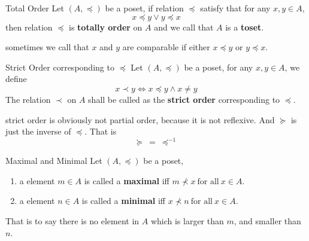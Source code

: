 \newpage

\begin{definition}{Total Order}{}
    Let $(A,\preceq)$ be a poset, if relation $\preceq$ satisfy that for any $x,y \in A$,
    \begin{equation*}
        x \preceq y \lor y \preceq x
    \end{equation*}
    then relation $\preceq$ is \textbf{totally order} on $A$ and we call that $A$ is a \textbf{toset}.
\end{definition}

\begin{remarks}
    sometimes we call that $x$ and $y$ are comparable if either $x \preceq y$ or $y \preceq x$.
\end{remarks}
\begin{definition}{Strict Order corresponding to $\preceq$}{}
    Let $(A,\preceq)$ be a poset, for any $x,y \in A$, we define
    \begin{equation*}
        x \prec y \iff  x \preceq y \land x \neq y
    \end{equation*}
    The relation $\prec$ on $A$ shall be called as the \textbf{strict order} corresponding to $\preceq$.
\end{definition}

\begin{remarks}
    strict order is obviously not partial order, because it is not reflexive. And $\succeq$ is just the inverse of $\preceq$. That is
    \begin{equation*}
        \succeq \ = \ \preceq^{-1}
    \end{equation*}
\end{remarks}

\begin{definition}{Maximal and Minimal}{}
    Let $(A,\preceq)$ be a poset, 
        \begin{enumerate}

            \item a element $m \in A$ is called a \textbf{maximal} iff $m \nprec x \ \text{for all}\ x \in A$.
            \item a element $n \in A$ is called a \textbf{minimal} iff $x \nprec n \ \text{for all}\ x \in A$.

        \end{enumerate}

    That is to say there is no element in $A$ which is larger than $m$, and smaller than $n$.
\end{definition}

